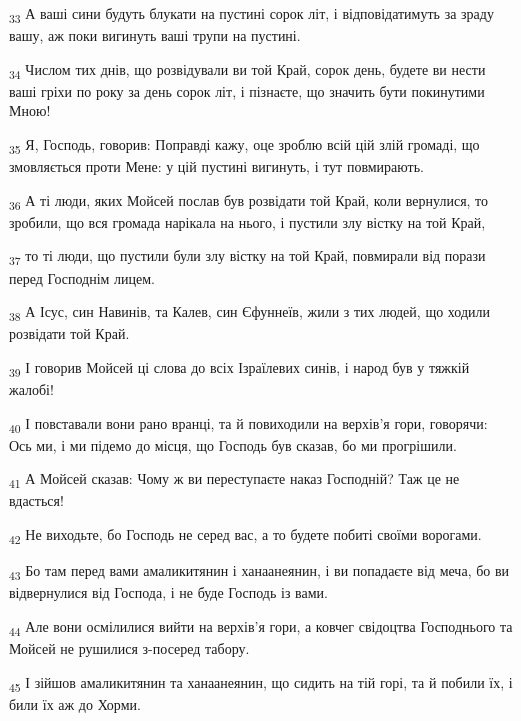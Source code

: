 \begin{tcolorbox}
\textsubscript{33} А ваші сини будуть блукати на пустині сорок літ, і відповідатимуть за зраду вашу, аж поки вигинуть ваші трупи на пустині.
\end{tcolorbox}
\begin{tcolorbox}
\textsubscript{34} Числом тих днів, що розвідували ви той Край, сорок день, будете ви нести ваші гріхи по року за день сорок літ, і пізнаєте, що значить бути покинутими Мною!
\end{tcolorbox}
\begin{tcolorbox}
\textsubscript{35} Я, Господь, говорив: Поправді кажу, оце зроблю всій цій злій громаді, що змовляється проти Мене: у цій пустині вигинуть, і тут повмирають.
\end{tcolorbox}
\begin{tcolorbox}
\textsubscript{36} А ті люди, яких Мойсей послав був розвідати той Край, коли вернулися, то зробили, що вся громада нарікала на нього, і пустили злу вістку на той Край,
\end{tcolorbox}
\begin{tcolorbox}
\textsubscript{37} то ті люди, що пустили були злу вістку на той Край, повмирали від порази перед Господнім лицем.
\end{tcolorbox}
\begin{tcolorbox}
\textsubscript{38} А Ісус, син Навинів, та Калев, син Єфуннеїв, жили з тих людей, що ходили розвідати той Край.
\end{tcolorbox}
\begin{tcolorbox}
\textsubscript{39} І говорив Мойсей ці слова до всіх Ізраїлевих синів, і народ був у тяжкій жалобі!
\end{tcolorbox}
\begin{tcolorbox}
\textsubscript{40} І повставали вони рано вранці, та й повиходили на верхів'я гори, говорячи: Ось ми, і ми підемо до місця, що Господь був сказав, бо ми прогрішили.
\end{tcolorbox}
\begin{tcolorbox}
\textsubscript{41} А Мойсей сказав: Чому ж ви переступаєте наказ Господній? Таж це не вдасться!
\end{tcolorbox}
\begin{tcolorbox}
\textsubscript{42} Не виходьте, бо Господь не серед вас, а то будете побиті своїми ворогами.
\end{tcolorbox}
\begin{tcolorbox}
\textsubscript{43} Бо там перед вами амаликитянин і ханаанеянин, і ви попадаєте від меча, бо ви відвернулися від Господа, і не буде Господь із вами.
\end{tcolorbox}
\begin{tcolorbox}
\textsubscript{44} Але вони осмілилися вийти на верхів'я гори, а ковчег свідоцтва Господнього та Мойсей не рушилися з-посеред табору.
\end{tcolorbox}
\begin{tcolorbox}
\textsubscript{45} І зійшов амаликитянин та ханаанеянин, що сидить на тій горі, та й побили їх, і били їх аж до Хорми.
\end{tcolorbox}
